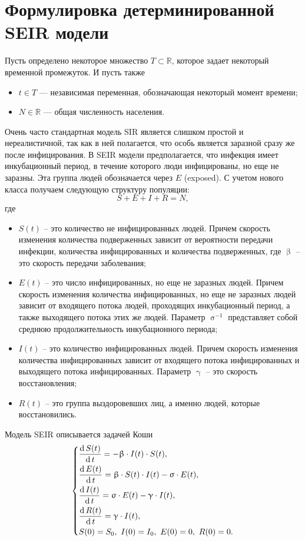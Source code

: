 \documentclass[a4paper, 14pt]{extreport}
\renewcommand{\beta}{\upbeta}
\renewcommand{\gamma}{\upgamma}
\renewcommand{\sigma}{\upsigma}
\renewcommand{\d}{\operatorname{d}}
\begin{document}
	\section{Формулировка детерминированной SEIR модели}
	Пусть определено некоторое множество $T \subset \mathbb R$, которое задает некоторый временной промежуток. И пусть также
	\begin{itemize}
		\item $t \in T$ --- независимая переменная, обозначающая некоторый момент времени;
		\item $N \in \mathbb R$ --- общая численность населения.
	\end{itemize}
	Очень часто стандартная модель SIR является слишком простой и
	нереалистичной, так как в ней полагается, что особь является заразной сразу же после инфицирования. В SEIR модели предполагается, что инфекция имеет инкубационный период, в течение которого люди инфицированы, но
	еще не заразны. Эта группа людей обозначается через $E$ (exposed). С учетом нового класса получаем следующую структуру
	популяции:
	$$S + E + I + R = N,$$ где
	\begin{itemize}
		\item $S(t)$ -- это количество не инфицированных людей. Причем скорость изменения количества подверженных зависит от вероятности передачи инфекции, количества инфицированных и количества подверженных, где $\beta$ -- это скорость передачи заболевания;
		\item $E(t)$ -- это число инфицированных, но еще не заразных людей. Причем скорость изменения количества инфицированных, но еще не заразных людей зависит от входящего потока людей, проходящих инкубационный период, а также выходящего потока этих же людей. Параметр $\sigma^{-1}$ представляет собой среднюю продолжительность инкубационного периода;
		\item $I(t)$ -- это количество инфицированных людей. Причем	скорость изменения количества инфицированных зависит от входящего потока инфицированных и выходящего потока инфицированных. Параметр $\gamma$ -- это скорость восстановления;
		\item $R(t)$ -- это группа выздоровевших лиц, а именно людей, которые восстановились.
	\end{itemize}
	Модель SEIR описывается задачей Коши
	\begin{equation}
		\label{seir}
		\begin{dcases}
			\dfrac {\d S(t)}{\d t} = - \beta \cdot I(t)\cdot S(t),\\
			\dfrac {\d E(t)}{\d t} = \beta \cdot S(t)\cdot I(t) - \sigma\cdot E(t),\\
			\dfrac{\d I(t)}{\d t} =\sigma \cdot E(t) - \gamma\cdot I(t),\\
			\dfrac{\d R(t)}{\d t} = \gamma\cdot I(t),\\
			S(0) = S_0,\ I(0) = I_0,\ E(0) = 0,\ R(0) = 0.
		\end{dcases}
	\end{equation}
	
\end{document}
